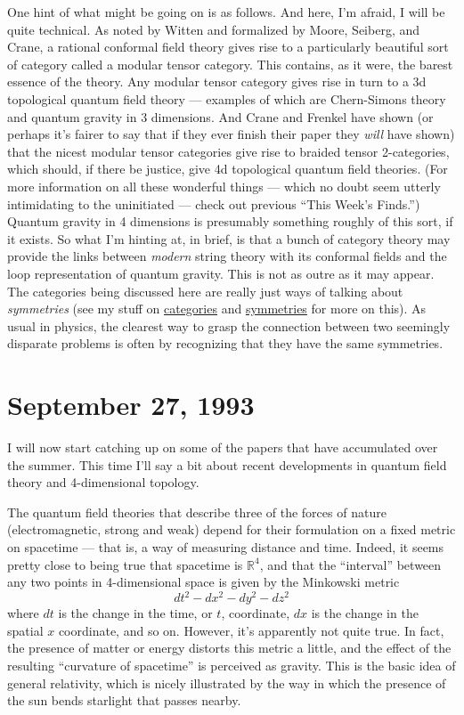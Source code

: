 \documentclass{article}
\begin{document}
One hint of what might be going on is as follows. And here, I'm afraid,
I will be quite technical. As noted by Witten and formalized by Moore,
Seiberg, and Crane, a rational conformal field theory gives rise to a
particularly beautiful sort of category called a modular tensor
category. This contains, as it were, the barest essence of the theory.
Any modular tensor category gives rise in turn to a 3d topological
quantum field theory --- examples of which are Chern-Simons theory and
quantum gravity in 3 dimensions. And Crane and Frenkel have shown (or
perhaps it's fairer to say that if they ever finish their paper they
\emph{will} have shown) that the nicest modular tensor categories give
rise to braided tensor 2-categories, which should, if there be justice,
give 4d topological quantum field theories. (For more information on all
these wonderful things --- which no doubt seem utterly intimidating to
the uninitiated --- check out previous ``This Week's Finds.'') Quantum
gravity in 4 dimensions is presumably something roughly of this sort, if
it exists. So what I'm hinting at, in brief, is that a bunch of category
theory may provide the links between \emph{modern} string theory with
its conformal fields and the loop representation of quantum gravity.
This is not as outre as it may appear. The categories being discussed
here are really just ways of talking about \emph{symmetries} (see my
stuff on
\href{http://math.ucr.edu/home/baez/categories.html}{categories} and
\href{http://math.ucr.edu/home/baez/symmetries.html}{symmetries} for
more on this). As usual in physics, the clearest way to grasp the
connection between two seemingly disparate problems is often by
recognizing that they have the same symmetries.
\hypertarget{week19}{%
\section{September 27, 1993}\label{week19}}

I will now start catching up on some of the papers that have accumulated
over the summer. This time I'll say a bit about recent developments in
quantum field theory and 4-dimensional topology.

The quantum field theories that describe three of the forces of nature
(electromagnetic, strong and weak) depend for their formulation on a
fixed metric on spacetime --- that is, a way of measuring distance and
time. Indeed, it seems pretty close to being true that spacetime is
\(\mathbb{R}^4\), and that the ``interval'' between any two points in
4-dimensional space is given by the Minkowski metric
\[dt^2 -dx^2 -dy^2 -dz^2\] where \(dt\) is the change in the time, or
\(t\), coordinate, \(dx\) is the change in the spatial \(x\) coordinate,
and so on. However, it's apparently not quite true. In fact, the
presence of matter or energy distorts this metric a little, and the
effect of the resulting ``curvature of spacetime'' is perceived as
gravity. This is the basic idea of general relativity, which is nicely
illustrated by the way in which the presence of the sun bends starlight
that passes nearby.
\end{document}
